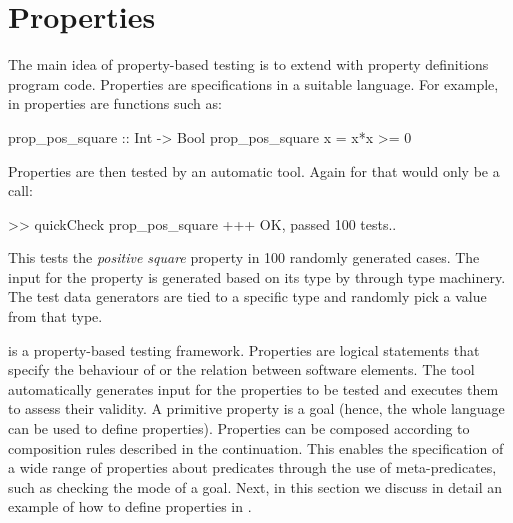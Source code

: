 

\section{Properties}
\label{sec:properties}

The main idea of property-based testing is to extend with property definitions
program code.
%
Properties are specifications in a suitable language.
%
For example, in \QuickCheck{} properties are \Haskell{} functions such as:
%
\begin{code}
 prop_pos_square :: Int -> Bool
 prop_pos_square x = x*x >= 0
\end{code}

Properties are then tested by an automatic tool.
%
Again for \Haskell{} \QuickCheck{} that would only be a call:
%
\begin{code}
 >> quickCheck prop_pos_square
 +++ OK, passed 100 tests..
\end{code}
%
This tests the \emph{positive square} property in 100 randomly
generated cases.
%
The input for the property is generated based on its type by
\QuickCheck{} through type machinery.
%
The test data generators are tied to a specific type and randomly pick a
value from that type.


\plqc{} is a property-based testing framework.
%
Properties are logical statements that specify the behaviour of or the relation between software
elements.
%
The tool automatically generates input for the properties to be tested
and executes them to assess their validity.
%
A primitive property is a %
\Prolog{} goal (hence, the whole
language can be used to define properties).
%
Properties can be composed according to composition
rules described in the continuation.
%
%
%
%
This enables the specification of a wide range of properties about
predicates through the use of meta-predicates, such as checking
the mode of a goal. %
%
Next, in this section we discuss in detail an example of how to define
properties in \plqc{}.


